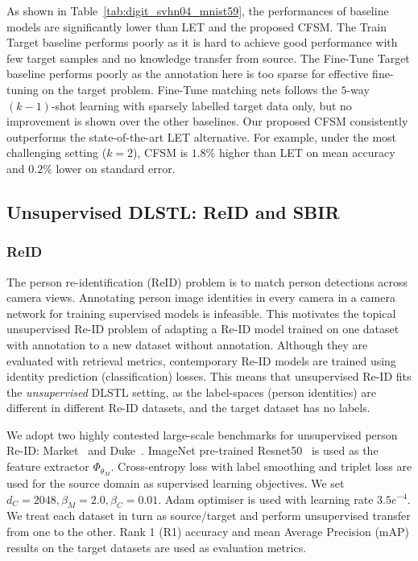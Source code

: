 \documentclass[letterpaper]{article} \usepackage{aaai19}  \usepackage{times}  \usepackage{helvet}  \usepackage{courier}  \usepackage{url}  \usepackage{graphicx}
\begin{document}
As shown in Table~\ref{tab:digit_svhn04_mnist59}, the performances of baseline models are significantly lower than LET and the proposed CFSM. The Train Target baseline performs poorly as it is hard to achieve good performance with few target samples and no knowledge transfer from source. The Fine-Tune Target baseline performs poorly as the annotation here is too sparse for effective fine-tuning on the target problem. 
Fine-Tune matching nets follows the $5$-way $(k-1)$-shot learning with sparsely labelled target data only, but no improvement is shown over the other baselines.
Our proposed CFSM consistently outperforms the state-of-the-art LET alternative. For example, under the most challenging setting ($k=2$), CFSM is $1.8\%$ higher than LET on mean accuracy and $0.2\%$ lower on standard error.

\subsection{Unsupervised DLSTL: ReID and SBIR}
\subsubsection{ReID}
The person re-identification (ReID) problem is to match person detections across camera views. Annotating person image identities in every camera in a camera network for training supervised models is infeasible. This motivates the topical unsupervised  Re-ID problem of adapting a  Re-ID model trained on one dataset with annotation to a new dataset without annotation. Although they are evaluated with retrieval metrics, contemporary Re-ID models are trained using identity prediction (classification) losses. This means that unsupervised Re-ID fits the \emph{unsupervised} DLSTL setting, as the label-spaces (person identities) are different in different Re-ID datasets, and the target dataset has no labels.

We adopt two highly contested large-scale benchmarks for unsupervised person Re-ID: Market~\cite{zheng2015scalable} and Duke~\cite{zheng2017unlabeled}. ImageNet pre-trained Resnet50~\cite{resnet} is used as the feature extractor $\Phi_{\theta_M}$. Cross-entropy loss with label smoothing and triplet loss are used for the source domain as supervised learning objectives. We set $d_C=2048,\beta_M=2.0,\beta_C=0.01$. Adam optimiser is used with learning rate $3.5e^{-4}$. We treat each dataset in turn as source/target and perform unsupervised transfer from one to the other. 
 Rank 1 (R1) accuracy and mean Average Precision (mAP) results on the target datasets are used as evaluation metrics. 
 
\end{document}
